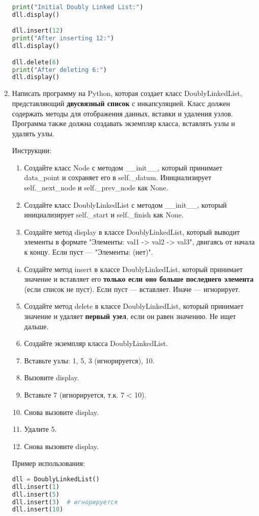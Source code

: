 \begin{enumerate}
\begin{lstlisting}[language=Python]
print("Initial Doubly Linked List:")
dll.display()

dll.insert(12)
print("After inserting 12:")
dll.display()

dll.delete(6)
print("After deleting 6:")
dll.display()
\end{lstlisting}

\item Написать программу на Python, которая создает класс DoublyLinkedList, представляющий \textbf{двусвязный список} с инкапсуляцией. Класс должен содержать методы для отображения данных, вставки и удаления узлов. Программа также должна создавать экземпляр класса, вставлять узлы и удалять узлы.

Инструкции:
\begin{enumerate}
    \item Создайте класс Node с методом \_\_init\_\_, который принимает data\_point и сохраняет его в self.\_datum. Инициализирует self.\_next\_node и self.\_prev\_node как None.
    \item Создайте класс DoublyLinkedList с методом \_\_init\_\_, который инициализирует self.\_start и self.\_finish как None.
    \item Создайте метод display в классе DoublyLinkedList, который выводит элементы в формате "Элементы: val1 -> val2 -> val3", двигаясь от начала к концу. Если пуст — "Элементы: (нет)".
    \item Создайте метод insert в классе DoublyLinkedList, который принимает значение и вставляет его \textbf{только если оно больше последнего элемента} (если список не пуст). Если пуст — вставляет. Иначе — игнорирует.
    \item Создайте метод delete в классе DoublyLinkedList, который принимает значение и удаляет \textbf{первый узел}, если он равен значению. Не ищет дальше.
    \item Создайте экземпляр класса DoublyLinkedList.
    \item Вставьте узлы: 1, 5, 3 (игнорируется), 10.
    \item Вызовите display.
    \item Вставьте 7 (игнорируется, т.к. 7 < 10).
    \item Снова вызовите display.
    \item Удалите 5.
    \item Снова вызовите display.
\end{enumerate}

Пример использования:
\begin{lstlisting}[language=Python]
dll = DoublyLinkedList()
dll.insert(1)
dll.insert(5)
dll.insert(3)  # игнорируется
dll.insert(10)


\end{lstlisting}
\end{enumerate}
